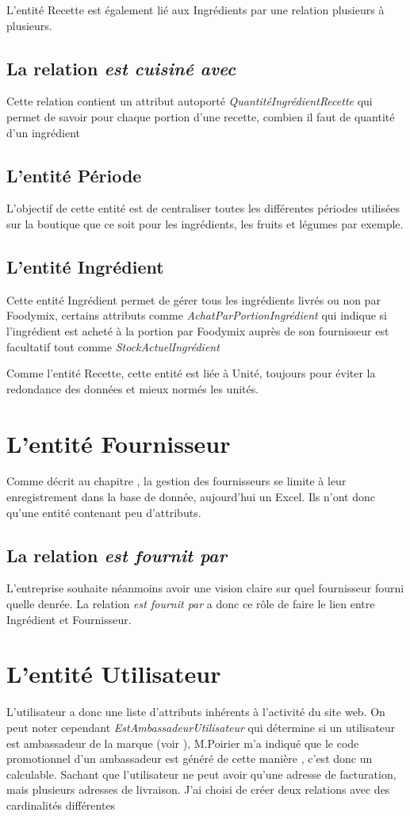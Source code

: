 \documentclass{article}
\begin{document}
L'entité Recette est également lié aux Ingrédients par une relation plusieurs à plusieurs.

\subsection{La relation \textit{est cuisiné avec}}
Cette relation contient un attribut autoporté \textit{QuantitéIngrédientRecette} qui permet de savoir pour chaque portion d'une recette, combien il faut de quantité d'un ingrédient

\subsection{L'entité Période}
L'objectif de cette entité est de centraliser toutes les différentes périodes utilisées sur la boutique que ce soit pour les ingrédients, les fruits et légumes par exemple.

\subsection{L'entité Ingrédient}
Cette entité Ingrédient permet de gérer tous les ingrédients livrés ou non par Foodymix, certains attributs comme \textit{AchatParPortionIngrédient} qui indique si l'ingrédient est acheté à la portion par Foodymix auprès de son fournisseur est facultatif tout comme \textit{StockActuelIngrédient}

Comme l'entité Recette, cette entité est liée à Unité, toujours pour éviter la redondance des données et mieux normés les unités.

\section{L'entité Fournisseur}
Comme décrit au chapitre , la gestion des fournisseurs se limite à leur enregistrement dans la base de donnée, aujourd'hui un Excel. Ils n'ont donc qu'une entité contenant peu d'attributs.

\subsection{La relation \textit{est fournit par}}
L'entreprise souhaite néanmoins avoir une vision claire sur quel fournisseur fourni quelle denrée. La relation \textit{est fournit par} a donc ce rôle de faire le lien entre Ingrédient et Fournisseur.

\section{L'entité Utilisateur}
L'utilisateur a donc une liste d'attributs inhérents à l'activité du site web. On peut noter cependant \textit{EstAmbassadeurUtilisateur} qui détermine si un utilisateur est ambassadeur de la marque (voir ), M.Poirier m'a indiqué que le code promotionnel d'un ambassadeur est généré de cette manière , c'est donc un calculable. Sachant que l'utilisateur ne peut avoir qu'une adresse de facturation, mais plusieurs adresses de livraison. J'ai choisi de créer deux relations avec des cardinalités différentes
\end{document}
